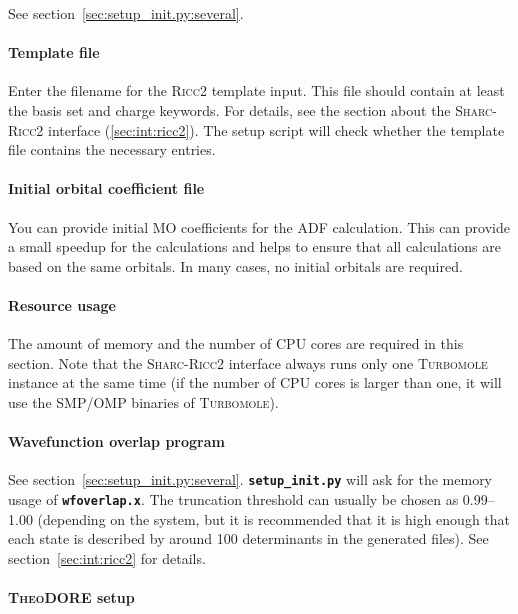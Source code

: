 \documentclass[a4paper,10pt,DIV=15,openany,twoside=false]{scrbook}
\newcommand{\sharc}{\textsc{Sharc}}
\newcommand{\ttt}[1]{\textbf{\texttt{#1}}}
\begin{document}
See section~\ref{sec:setup_init.py:several}.

\paragraph{Template file}

Enter the filename for the \textsc{Ricc2} template input. This file should contain at least the basis set and charge keywords. For details, see the section about the \sharc-\textsc{Ricc2} interface (\ref{sec:int:ricc2}). The setup script will check whether the template file contains the necessary entries. 

\paragraph{Initial orbital coefficient file}

You can provide initial MO coefficients for the \textsc{ADF} calculation. This can provide a small speedup for the calculations and helps to ensure that all calculations are based on the same orbitals.
In many cases, no initial orbitals are required.

\paragraph{Resource usage}

The amount of memory and the number of CPU cores are required in this section.
Note that the \sharc-\textsc{Ricc2} interface always runs only one \textsc{Turbomole} instance at the same time (if the number of CPU cores is larger than one, it will use the SMP/OMP binaries of \textsc{Turbomole}).

\paragraph{Wavefunction overlap program}

See section~\ref{sec:setup_init.py:several}. \ttt{setup\_init.py} will ask for the memory usage of \ttt{wfoverlap.x}. The truncation threshold can usually be chosen as 0.99--1.00 (depending on the system, but it is recommended that it is high enough that each state is described by around 100 determinants in the generated files). See section~\ref{sec:int:ricc2} for details.

\paragraph{\textsc{TheoDORE} setup}
\end{document}
